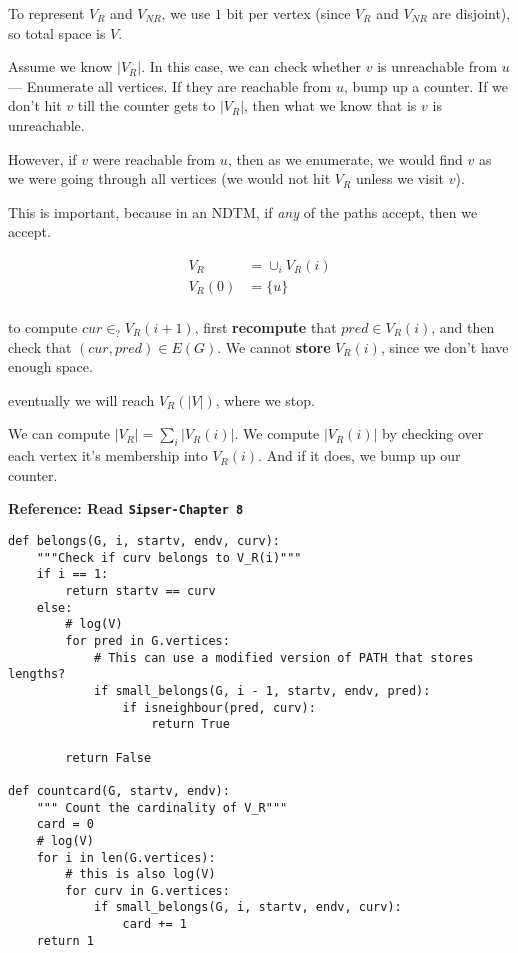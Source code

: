 To represent $V_R$ and $V_{NR}$, we use $1$ bit per vertex 
(since $V_R$ and $V_{NR}$ are disjoint), so total space is $V$.

Assume we know $|V_R|$. In this case, we can check whether $v$ is unreachable
from $u$ --- Enumerate all vertices. If they are reachable from $u$, bump up
a counter.  If we don't hit $v$ till the counter gets to $|V_R|$, then what
we know that is $v$ is unreachable.

However, if $v$ were reachable from $u$, then as we enumerate, we would find
$v$ as we were going through all vertices (we would not hit $V_R$ unless we
visit $v$).

This is important, because in an NDTM, if \textit{any} of the paths
accept, then we accept.

\begin{align*}
V_R &= \cup_i V_R(i) \\
V_R(0) &= \{ u \} \\
\end{align*}

to compute $cur \in_? V_R(i + 1)$, first \textbf{recompute} that $pred \in V_R(i)$,
and then check that $(cur, pred) \in E(G)$. We cannot \textbf{store} $V_R(i)$, since
we don't have enough space.

eventually we will reach $V_R(|V|)$, where we stop.

We can compute $|V_R| = \sum_i |V_R(i)|$.
We compute $|V_R(i)|$ by checking over each vertex it's membership into $V_R(i)$.
And if it does, we bump up our counter. 

\textbf{Reference: Read \texttt{Sipser-Chapter 8}}

\begin{verbatim}
def belongs(G, i, startv, endv, curv):
    """Check if curv belongs to V_R(i)"""
    if i == 1:
        return startv == curv
    else:
        # log(V)
        for pred in G.vertices:
            # This can use a modified version of PATH that stores lengths?
            if small_belongs(G, i - 1, startv, endv, pred):
                if isneighbour(pred, curv):
                    return True

        return False

def countcard(G, startv, endv):
    """ Count the cardinality of V_R"""
    card = 0
    # log(V)
    for i in len(G.vertices):
        # this is also log(V)
        for curv in G.vertices:
            if small_belongs(G, i, startv, endv, curv):
                card += 1
    return 1
\end{verbatim}

